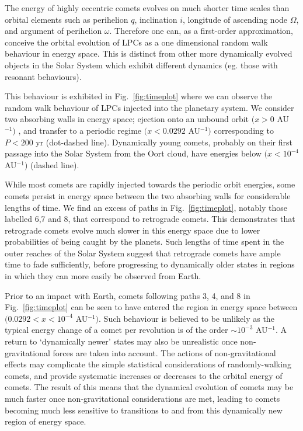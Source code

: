 The energy of highly eccentric comets evolves on much shorter time scales than orbital elements such as perihelion $q$, inclination $i$, longitude of ascending node $\Omega$, and argument of perihelion $\omega$. Therefore one can, as a first-order approximation, conceive the orbital evolution of LPCs as a one dimensional random walk behaviour in energy space. This is distinct from other more dynamically evolved objects in the Solar System which exhibit different dynamics (eg. those with resonant behaviours). 

This behaviour is exhibited in Fig.~\ref{fig:timeplot} where we can observe the random walk behaviour of LPCs injected into the planetary system. We consider two absorbing walls in energy space; ejection onto an unbound orbit $(x > 0$ AU$^{-1})$ , and transfer to a periodic regime $(x < 0.0292$ AU$^{-1})$ corresponding to $P < 200$ yr (dot-dashed line). Dynamically young comets, probably on their first passage into the Solar System from the Oort cloud, have energies below $(x < 10^{-4}$ AU$^{-1})$ (dashed line).

While most comets are rapidly injected towards the periodic orbit energies, some comets persist in energy space between the two absorbing walls for considerable lengths of time. We find an excess of paths in Fig.~\ref{fig:timeplot}, notably those labelled 6,7 and 8, that correspond to retrograde comets. This demonstrates that retrograde comets evolve much slower in this energy space due to lower probabilities of being caught by the planets. Such lengths of time spent in the outer reaches of the Solar System suggest that retrograde comets have ample time to fade sufficiently, before progressing to dynamically older states in regions in which they can more easily be observed from Earth.

Prior to an impact with Earth, comets following paths 3, 4, and 8 in Fig.~\ref{fig:timeplot} can be seen to have entered the region in energy space between $(0.0292 < x < 10^{-4}$ AU$^{-1})$. Such behaviour is believed to be unlikely as the typical energy change of a comet per revolution is of the order $\sim10^{-3}$ AU$^{-1}$. A return to `dynamically newer' states may also be unrealistic once non-gravitational forces are taken into account. The actions of non-gravitational effects may complicate the simple statistical considerations of randomly-walking comets, and provide systematic increases or decreases to the orbital energy of comets. The result of this means that the dynamical evolution of comets may be much faster once non-gravitational considerations are met, leading to comets becoming much less sensitive to transitions to and from this dynamically new region of energy space.


